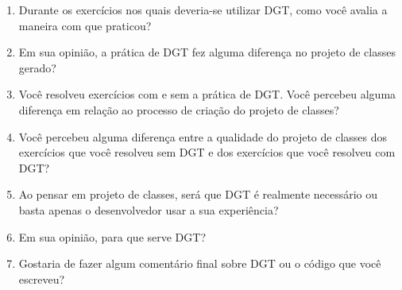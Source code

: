 \begin{enumerate}
	
\item Durante os exercícios nos quais deveria-se utilizar DGT, como você avalia a maneira com que praticou?	

\item Em sua opinião, a prática de DGT fez alguma diferença no projeto de classes gerado?	

\item Você resolveu exercícios com e sem a prática de DGT. Você percebeu alguma diferença em relação ao processo de criação do projeto de classes?	

\item Você percebeu alguma diferença entre a qualidade do projeto de classes dos exercícios que você resolveu sem DGT e dos exercícios que você resolveu com DGT?	

\item Ao pensar em projeto de classes, será que DGT é realmente necessário ou basta apenas o desenvolvedor usar a sua experiência?	

\item Em sua opinião, para que serve DGT?	

\item Gostaria de fazer algum comentário final sobre DGT ou o código que você escreveu?	

\end{enumerate}

